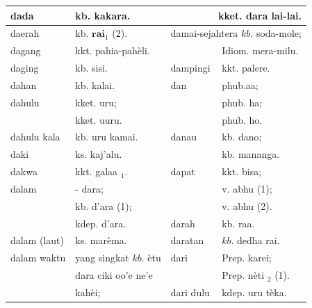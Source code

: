 \documentclass[10pt]{article}
\begin{document}
\begin{center}
\begin{tabular}{|l|l|l|l|}
\hline
dada & kb. kakara. & \multicolumn{2}{|r|}{kket. dara lai-lai.} \\
\hline
daerah & kb. \(\mathbf{r a i}_{1}\) (2). & \multicolumn{2}{|c|}{damai-sejahtera \(k b\). soda-mole;} \\
\hline
dagang & kkt. pahia-pahèli. &  & Idiom. mera-milu. \\
\hline
daging & kb. sisi. & dampingi & kkt. palere. \\
\hline
dahan & kb. kalai. & dan & phub.aa; \\
\hline
dahulu & kket. uru; &  & phub. ha; \\
\hline
 & kket. uuru. &  & phub. ho. \\
\hline
dahulu kala & kb. uru kamai. & danau & kb. dano; \\
\hline
daki & ks. kaj'alu. &  & kb. mananga. \\
\hline
dakwa & kkt. galaa \({ }_{1}\). & dapat & kkt. bisa; \\
\hline
dalam & - dara; &  & v. abhu (1); \\
\hline
 & kb. d'ara (1); &  & v. abhu (2). \\
\hline
 & kdep. d'ara. & darah & kb. raa. \\
\hline
dalam (laut) & ks. marèma. & daratan & \(k b\). dedha rai. \\
\hline
dalam waktu & yang singkat \(k b\). ètu & dari & Prep. karei; \\
\hline
 & dara ciki oo'e ne'e &  & Prep. nèti \({ }_{2}\) (1). \\
\hline
 & kahèi; & dari dulu & kdep. uru tèka. \\
\hline
\end{tabular}
\end{center}
\end{document}
